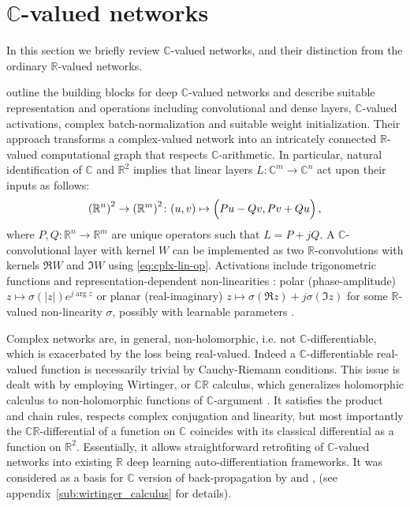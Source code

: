 \documentclass[a4paper,10pt]{article}
\newcommand{\real}{\mathbb{R}}
\newcommand{\cplx}{\mathbb{C}}
\newcommand{\important}[1]{\textbf{\!\colorbox{red}{#1}\!}}
\newcommand{\todo}[1]{{\color{blue} [TODO]} \important{#1}}
\begin{document}



\section{$\cplx$-valued networks} %
\label{sec:c_valued_networks}

In this section we briefly review $\cplx$-valued networks, and their distinction from the
ordinary $\real$-valued networks.

\citet{trabelsi_deep_2017} outline the building blocks for deep $\cplx$-valued networks
and describe suitable representation and operations including convolutional and dense layers,
$\cplx$-valued activations, complex batch-normalization and suitable weight initialization.
Their approach transforms a complex-valued network into an intricately connected $\real$-valued
computational graph that respects $\cplx$-arithmetic.
%
In particular, natural identification of $\cplx$ and $\real^2$ implies that linear layers $
  L \colon \cplx^m \to \cplx^n
$ act upon their inputs as follows:
\begin{equation}  \label{eq:cplx-lin-op}
  {(\real^n)}^{2}
    \to {(\real^m)}^{2}
    \colon (u, v)
      \mapsto \Bigl(
        P u - Q v,
        P v + Q u
      \Bigr)
    \,,
\end{equation}
where $
  P, Q \colon \real^{n} \to \real^{m}
$ are unique operators such that $L = P + j Q$. A $\cplx$-convolutional layer with kernel
$W$ can be implemented as two $\real$-convolutions with kernels $\Re{W}$ and $\Im{W}$ using
\eqref{eq:cplx-lin-op}. Activations include trigonometric functions and representation-dependent
non-linearities \citep{hirose_complex-valued_2009}: polar (phase-amplitude) $
  z \mapsto \sigma(\lvert z \rvert) e^{j \arg z}
$ or planar (real-imaginary) $
  z \mapsto \sigma(\Re z) + j \sigma(\Im z)
$ for some $\real$-valued non-linearity $\sigma$, possibly with learnable parameters
\citep{trabelsi_deep_2017,wolter_complex_2018}.

Complex networks are, in general, non-holomorphic, i.e. not $\cplx$-differentiable, which is
exacerbated by the loss being real-valued. Indeed a $\cplx$-differentiable real-valued function is
necessarily trivial by Cauchy-Riemann conditions. This issue is dealt with by employing Wirtinger,
or $\cplx\real$ calculus, which generalizes holomorphic calculus to non-holomorphic functions
of $\cplx$-argument \citep{adali_complex-valued_2011,boeddeker_computation_2019}. It satisfies
the product and chain rules, respects complex conjugation and linearity, but most importantly the
$\cplx\real$-differential of a function on $\cplx$ coincides with its classical differential as
a function on $\real^2$. Essentially, it allows straightforward retrofiting of $\cplx$-valued
networks into existing $\real$ deep learning auto-differentiation frameworks. It was considered
as a basis for $\cplx$ version of back-propagation by \citet{benvenuto_complex_1992} and
\citet{trabelsi_deep_2017}, (see appendix~\ref{sub:wirtinger_calculus} for details).
\end{document}
